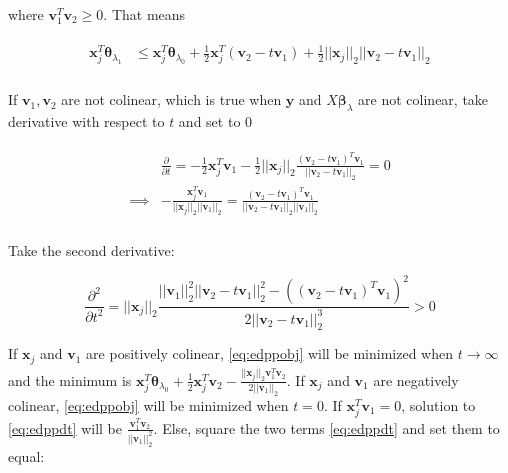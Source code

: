where $\boldsymbol v_1^T\boldsymbol v_2\geq0$. That means

\begin{gather}
    \label{eq:edppobj}
    \begin{aligned}
        \boldsymbol x_j^T\boldsymbol\theta_{\lambda_1}&\leq \boldsymbol x_j^T\boldsymbol\theta_{\lambda_0}+\frac{1}{2}\boldsymbol x_j^T(\boldsymbol v_2-t\boldsymbol v_1)+\frac{1}{2}||\boldsymbol x_j||_2||\boldsymbol v_2-t\boldsymbol v_1||_2\\
    \end{aligned}
\end{gather}

If $\boldsymbol v_1,\boldsymbol v_2$ are not colinear, which is true when $\boldsymbol y$ and $X\boldsymbol\beta_\lambda$ are not colinear, take derivative with respect to $t$ and set to 0

\begin{gather}
    \label{eq:edppdt}
    \begin{aligned}
        &\frac{\partial}{\partial t}=-\frac{1}{2}\boldsymbol x_j^T\boldsymbol v_1-\frac{1}{2}||\boldsymbol x_j||_2\frac{(\boldsymbol v_2-t\boldsymbol v_1)^T\boldsymbol v_1}{||\boldsymbol v_2-t\boldsymbol v_1||_2}=0\\
        \implies & -\frac{\boldsymbol x_j^T\boldsymbol v_1}{||\boldsymbol x_j||_2||\boldsymbol v_1||_2}=\frac{(\boldsymbol v_2-t\boldsymbol v_1)^T\boldsymbol v_1}{||\boldsymbol v_2-t\boldsymbol v_1||_2||\boldsymbol v_1||_2}\\
    \end{aligned}
\end{gather}

Take the second derivative:

\begin{equation}
    \frac{\partial^2}{\partial t^2}=||\boldsymbol x_j||_2\frac{||\boldsymbol v_1||^2_2||\boldsymbol v_2-t\boldsymbol v_1||^2_2-\left((\boldsymbol v_2-t\boldsymbol v_1)^T\boldsymbol v_1\right)^2}{2||\boldsymbol v_2-t\boldsymbol v_1||^3_2}>0
\end{equation}

If $\boldsymbol x_j$ and $\boldsymbol v_1$ are positively colinear, \eqref{eq:edppobj} will be minimized when $t\xrightarrow[]{}\infty$ and the minimum is $\boldsymbol x_j^T\boldsymbol\theta_{\lambda_0}+\frac{1}{2}\boldsymbol x_j^T \boldsymbol v_2-\frac{||\boldsymbol x_j||_2 \boldsymbol v_1^T \boldsymbol v_2}{2||\boldsymbol v_1||_2 }$. If $\boldsymbol x_j$ and $\boldsymbol v_1$ are negatively colinear, \eqref{eq:edppobj} will be minimized when $t=0$. If $\boldsymbol x_j^T \boldsymbol v_1=0$, solution to \eqref{eq:edppdt} will be $\frac{\boldsymbol v_1^T \boldsymbol v_2}{||\boldsymbol v_1||_2^2}$.  Else, square the two terms \eqref{eq:edppdt} and set them to equal:

